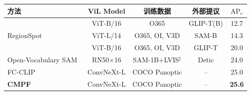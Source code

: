 \begin{table}[!htbp]\centering
    \setlength{\tabcolsep}{2pt}
    \vspace{0.5em}\centering\wuhao
    \begin{tabular}{lcccc}
        \toprule
        方法 & ViL Model & 训练数据 & 外部提议 & $\text{AP}_r$ \\
        \midrule
        & ViT-B/16 & O365 & GLIP-T(B) & 12.7 \\
        RegionSpot~\cite{yang2024recognize} & ViT-L/14 & O365, OI, V3D & SAM-B & 14.3 \\
        & ViT-B/16 & O365, OI, V3D & GLIP-T & 20.0 \\
        \midrule
        Open-Vocabulary SAM~\cite{yuan2024open} & RN50$\times$16 & SAM-1B+LVIS$^\ddag$ & Detic & 24.0 \\
        \midrule
        FC-CLIP~\cite{yu2023convolutions} & ConvNeXt-L & COCO Panoptic & -- & 25.0 \\
        \textbf{CMPF} & ConvNeXt-L & COCO Panoptic & -- & \textbf{25.6} \\
        \bottomrule
    \end{tabular}
\end{table}
